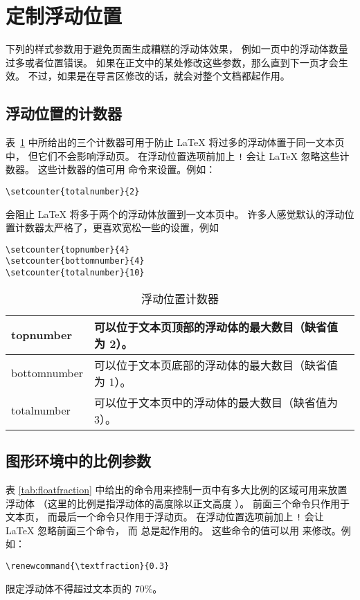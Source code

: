 \section{定制浮动位置}\label{sec:typerule}

下列的样式参数用于避免页面生成糟糕的浮动体效果，
例如一页中的浮动体数量过多或者位置错误。
如果在正文中的某处修改这些参数，那么直到下一页才会生效。
不过，如果是在导言区修改的话，就会对整个文档都起作用。

\subsection{浮动位置的计数器}

表~\ref{tab:floatcounter} 中所给出的三个计数器可用于防止 \LaTeX{} 将过多的浮动体置于同一文本页中，
但它们不会影响浮动页。
在浮动位置选项前加上 \texttt{!} 会让 \LaTeX{} 忽略这些计数器。
这些计数器的值可用  命令来设置。例如：
\begin{lstlisting}
\setcounter{totalnumber}{2}
\end{lstlisting}
会阻止 \LaTeX{} 将多于两个的浮动体放置到一文本页中。
许多人感觉默认的浮动位置计数器太严格了，更喜欢宽松一些的设置，例如
\begin{lstlisting}
\setcounter{topnumber}{4}
\setcounter{bottomnumber}{4}
\setcounter{totalnumber}{10}
\end{lstlisting}

\begin{table}[htp]
	\centering
	\caption{浮动位置计数器}\label{tab:floatcounter}
	\begin{tabular}{>{\ttfamily}l p{} }
		\toprule
		topnumber & 可以位于文本页顶部的浮动体的最大数目（缺省值为 2）。\\
		\hline
		bottomnumber & 可以位于文本页底部的浮动体的最大数目（缺省值为 1）。\\
		\hline
		totalnumber & 可以位于文本页中的浮动体的最大数目（缺省值为 3）。 \\
		\bottomrule
	\end{tabular}
\end{table}

\subsection{图形环境中的比例参数}\label{ssec:figpara}

表 \ref{tab:floatfraction} 中给出的命令用来控制一页中有多大比例的区域可用来放置浮动体
（这里的比例是指浮动体的高度除以正文高度 ）。
前面三个命令只作用于文本页，
而最后一个命令只作用于浮动页。
在浮动位置选项前加上 \texttt{!} 会让 \LaTeX{} 忽略前面三个命令，
而  总是起作用的。
这些命令的值可以用  来修改。例如：
\begin{lstlisting}
\renewcommand{\textfraction}{0.3}
\end{lstlisting}
限定浮动体不得超过文本页的 $70\percent$。

